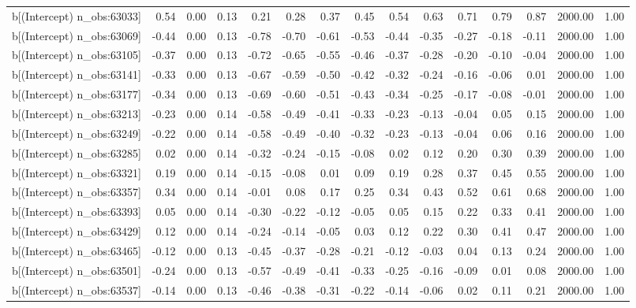 \begin{table}[ht]
\begin{tabular}{rrrrrrrrrrrrrrr}
  b[(Intercept) n\_obs:63033] & 0.54 & 0.00 & 0.13 & 0.21 & 0.28 & 0.37 & 0.45 & 0.54 & 0.63 & 0.71 & 0.79 & 0.87 & 2000.00 & 1.00 \\ 
  b[(Intercept) n\_obs:63069] & -0.44 & 0.00 & 0.13 & -0.78 & -0.70 & -0.61 & -0.53 & -0.44 & -0.35 & -0.27 & -0.18 & -0.11 & 2000.00 & 1.00 \\ 
  b[(Intercept) n\_obs:63105] & -0.37 & 0.00 & 0.13 & -0.72 & -0.65 & -0.55 & -0.46 & -0.37 & -0.28 & -0.20 & -0.10 & -0.04 & 2000.00 & 1.00 \\ 
  b[(Intercept) n\_obs:63141] & -0.33 & 0.00 & 0.13 & -0.67 & -0.59 & -0.50 & -0.42 & -0.32 & -0.24 & -0.16 & -0.06 & 0.01 & 2000.00 & 1.00 \\ 
  b[(Intercept) n\_obs:63177] & -0.34 & 0.00 & 0.13 & -0.69 & -0.60 & -0.51 & -0.43 & -0.34 & -0.25 & -0.17 & -0.08 & -0.01 & 2000.00 & 1.00 \\ 
  b[(Intercept) n\_obs:63213] & -0.23 & 0.00 & 0.14 & -0.58 & -0.49 & -0.41 & -0.33 & -0.23 & -0.13 & -0.04 & 0.05 & 0.15 & 2000.00 & 1.00 \\ 
  b[(Intercept) n\_obs:63249] & -0.22 & 0.00 & 0.14 & -0.58 & -0.49 & -0.40 & -0.32 & -0.23 & -0.13 & -0.04 & 0.06 & 0.16 & 2000.00 & 1.00 \\ 
  b[(Intercept) n\_obs:63285] & 0.02 & 0.00 & 0.14 & -0.32 & -0.24 & -0.15 & -0.08 & 0.02 & 0.12 & 0.20 & 0.30 & 0.39 & 2000.00 & 1.00 \\ 
  b[(Intercept) n\_obs:63321] & 0.19 & 0.00 & 0.14 & -0.15 & -0.08 & 0.01 & 0.09 & 0.19 & 0.28 & 0.37 & 0.45 & 0.55 & 2000.00 & 1.00 \\ 
  b[(Intercept) n\_obs:63357] & 0.34 & 0.00 & 0.14 & -0.01 & 0.08 & 0.17 & 0.25 & 0.34 & 0.43 & 0.52 & 0.61 & 0.68 & 2000.00 & 1.00 \\ 
  b[(Intercept) n\_obs:63393] & 0.05 & 0.00 & 0.14 & -0.30 & -0.22 & -0.12 & -0.05 & 0.05 & 0.15 & 0.22 & 0.33 & 0.41 & 2000.00 & 1.00 \\ 
  b[(Intercept) n\_obs:63429] & 0.12 & 0.00 & 0.14 & -0.24 & -0.14 & -0.05 & 0.03 & 0.12 & 0.22 & 0.30 & 0.41 & 0.47 & 2000.00 & 1.00 \\ 
  b[(Intercept) n\_obs:63465] & -0.12 & 0.00 & 0.13 & -0.45 & -0.37 & -0.28 & -0.21 & -0.12 & -0.03 & 0.04 & 0.13 & 0.24 & 2000.00 & 1.00 \\ 
  b[(Intercept) n\_obs:63501] & -0.24 & 0.00 & 0.13 & -0.57 & -0.49 & -0.41 & -0.33 & -0.25 & -0.16 & -0.09 & 0.01 & 0.08 & 2000.00 & 1.00 \\ 
  b[(Intercept) n\_obs:63537] & -0.14 & 0.00 & 0.13 & -0.46 & -0.38 & -0.31 & -0.22 & -0.14 & -0.06 & 0.02 & 0.11 & 0.21 & 2000.00 & 1.00 \\ 

\end{tabular}
\end{table}
